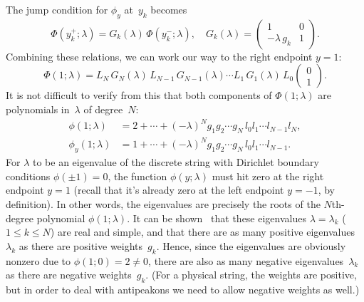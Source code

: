 \documentclass[10pt,a4paper]{article} \pdfoutput=1 
\begin{document}
The jump condition for $\phi_y$ at~$y_k$ becomes
\begin{equation}
  \label{eq:CH-jump-matrix-Gk}
  \Phi(y_{k}^+;\lambda)
  = G_k(\lambda) \, \Phi(y_{k}^-;\lambda)
  ,\quad
  G_k(\lambda) =
  \begin{pmatrix}
    1 & 0 \\
    -\lambda \, g_k & 1
  \end{pmatrix}
  .
\end{equation}
Combining these relations, we can work our way to the right endpoint $y=1$:
\begin{equation}
  \label{eq:CH-string-right-endpoint-matrix-product}
  \Phi(1;\lambda)
  = L_N \, G_N(\lambda) \, L_{N-1} \, G_{N-1}(\lambda) \dotsm L_1 \, G_1(\lambda) \, L_0
  \begin{pmatrix} 0 \\ 1 \end{pmatrix}
  .
\end{equation}
It is not difficult to verify from this that both components of $\Phi(1;\lambda)$
are polynomials in~$\lambda$ of degree~$N$:
\begin{equation}
  \begin{aligned}
    \label{eq:CH-string-right-endpoint-polynomials}
    \phi(1;\lambda) &= 2 + \cdots + (-\lambda)^{N} g_1 g_2 \dotsm g_N \, l_0 l_1 \dotsm l_{N-1} l_N
    ,\\
    \phi_y(1;\lambda) &= 1 + \cdots + (-\lambda)^{N} g_1 g_2 \dotsm g_N \, l_0 l_1 \dotsm l_{N-1}
    .
  \end{aligned}
\end{equation}
For $\lambda$ to be an eigenvalue of the discrete string with Dirichlet boundary
conditions $\phi(\pm 1)=0$, the function $\phi(y;\lambda)$
must hit zero at the right endpoint $y=1$
(recall that it's already zero at the left endpoint $y=-1$, by definition).
In other words, the eigenvalues are precisely the roots of the $N$th-degree polynomial $\phi(1;\lambda)$.
It can be shown~\cite{beals-sattinger-szmigielski:2000:moment}
that these eigenvalues $\lambda = \lambda_k$ ($1 \le k \le N$)
are real and simple,
and that there are as many positive eigenvalues~$\lambda_k$
as there are positive weights~$g_k$.
Hence, since the eigenvalues are obviously nonzero due to $\phi(1;0) = 2 \neq 0$,
there are also as many negative eigenvalues~$\lambda_k$
as there are negative weights~$g_k$.
(For a physical string, the weights are positive, but in order to deal with antipeakons
we need to allow negative weights as well.)
\end{document}
